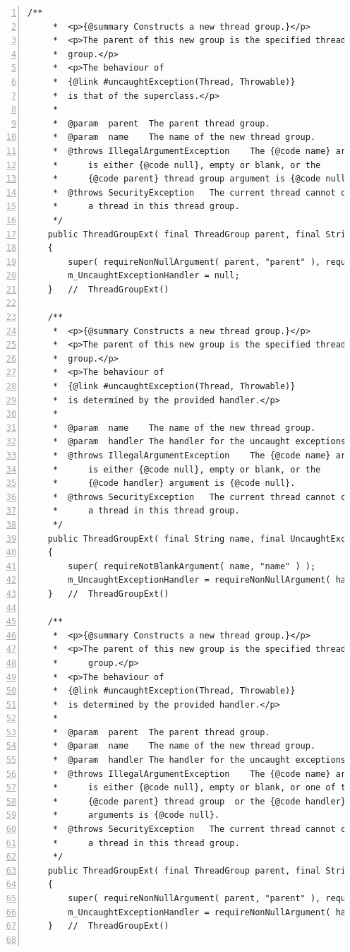 \documentclass[11pt,a4paper, titlepage, parskip=half, headsepline, footsepline, cleardoublepage=current, headheight=1cm]{scrbook}
\begin{document}
\begin{lstlisting}[numbers=left,caption={ThreadGroupExt.java}]
    /**
     *  <p>{@summary Constructs a new thread group.}</p>
     *  <p>The parent of this new group is the specified thread
     *  group.</p>
     *  <p>The behaviour of
     *  {@link #uncaughtException(Thread, Throwable)}
     *  is that of the superclass.</p>
     *
     *  @param  parent  The parent thread group.
     *  @param  name    The name of the new thread group.
     *  @throws IllegalArgumentException    The {@code name} argument
     *      is either {@code null}, empty or blank, or the 
     *      {@code parent} thread group argument is {@code null}.
     *  @throws SecurityException   The current thread cannot create
     *      a thread in this thread group.
     */
    public ThreadGroupExt( final ThreadGroup parent, final String name ) throws IllegalArgumentException
    {
        super( requireNonNullArgument( parent, "parent" ), requireNotBlankArgument( name, "name" ) );
        m_UncaughtExceptionHandler = null;
    }   //  ThreadGroupExt()

    /**
     *  <p>{@summary Constructs a new thread group.}</p>
     *  <p>The parent of this new group is the specified thread
     *  group.</p>
     *  <p>The behaviour of
     *  {@link #uncaughtException(Thread, Throwable)}
     *  is determined by the provided handler.</p>
     *
     *  @param  name    The name of the new thread group.
     *  @param  handler The handler for the uncaught exceptions.
     *  @throws IllegalArgumentException    The {@code name} argument
     *      is either {@code null}, empty or blank, or the
     *      {@code handler} argument is {@code null}.
     *  @throws SecurityException   The current thread cannot create
     *      a thread in this thread group.
     */
    public ThreadGroupExt( final String name, final UncaughtExceptionHandler handler ) throws IllegalArgumentException
    {
        super( requireNotBlankArgument( name, "name" ) );
        m_UncaughtExceptionHandler = requireNonNullArgument( handler, "handler" );
    }   //  ThreadGroupExt()

    /**
     *  <p>{@summary Constructs a new thread group.}</p>
     *  <p>The parent of this new group is the specified thread
     *      group.</p>
     *  <p>The behaviour of
     *  {@link #uncaughtException(Thread, Throwable)}
     *  is determined by the provided handler.</p>
     *
     *  @param  parent  The parent thread group.
     *  @param  name    The name of the new thread group.
     *  @param  handler The handler for the uncaught exceptions.
     *  @throws IllegalArgumentException    The {@code name} argument
     *      is either {@code null}, empty or blank, or one of the 
     *      {@code parent} thread group  or the {@code handler}
     *      arguments is {@code null}.
     *  @throws SecurityException   The current thread cannot create
     *      a thread in this thread group.
     */
    public ThreadGroupExt( final ThreadGroup parent, final String name, final UncaughtExceptionHandler handler ) throws IllegalArgumentException
    {
        super( requireNonNullArgument( parent, "parent" ), requireNotBlankArgument( name, "name" ) );
        m_UncaughtExceptionHandler = requireNonNullArgument( handler, "handler" );
    }   //  ThreadGroupExt()


\end{lstlisting}
\end{document}
